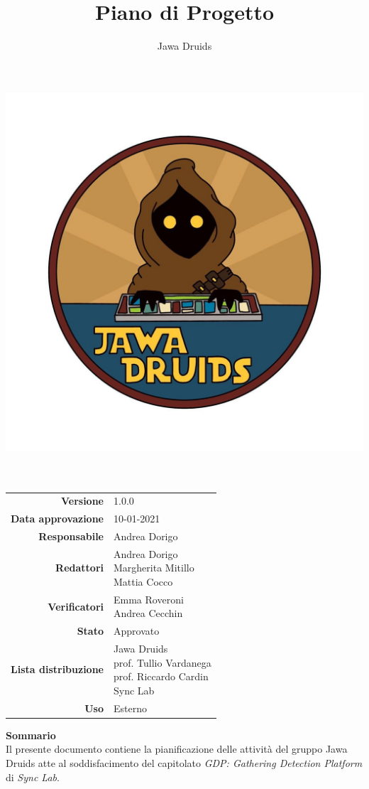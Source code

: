




\makeatletter
\begin{titlepage}
	\begin{center}
		\vspace*{-5cm}
		\author{Jawa Druids}
		\title{Piano di Progetto}
		\date{} %
		\includegraphics[width=0.5\linewidth]{../immagini/DRUIDSLOGO.jpg}\\[4ex]
		{\huge \bfseries  \@title }\\[2ex]
		{\LARGE  \@author}\\[50ex]
		\vspace*{-9cm}
		\begin{table}[H]
			\renewcommand{\arraystretch}{1.4}
			\centering
			\begin{tabular}{r | l}
				\textbf{Versione} & 1.0.0 \\%
				\textbf{Data approvazione} & 10-01-2021\\
				\textbf{Responsabile} & Andrea Dorigo\\
				\textbf{Redattori} & \makecell[tl]{Andrea Dorigo \\ Margherita Mitillo \\ Mattia Cocco} \\
				\textbf{Verificatori} & \makecell[tl]{Emma Roveroni \\ Andrea Cecchin} \\
				\textbf{Stato} & Approvato\\
				\textbf{Lista distribuzione} & \makecell[tl]{Jawa Druids \\ prof. Tullio Vardanega \\ prof. Riccardo Cardin \\ Sync Lab}\\
				\textbf{Uso} & Esterno
			\end{tabular}
		\end{table}
		\vspace{0.1cm}
		\hfill \break
		\fontsize{17}{10}\textbf{Sommario} \\
		\vspace{0.1cm}
    Il presente documento contiene la pianificazione delle attività del gruppo Jawa Druids atte al soddisfacimento del capitolato \normalsize\textit{GDP: Gathering Detection Platform} di  \normalsize\textit{Sync Lab}.
	\end{center}
\end{titlepage}
\makeatother

